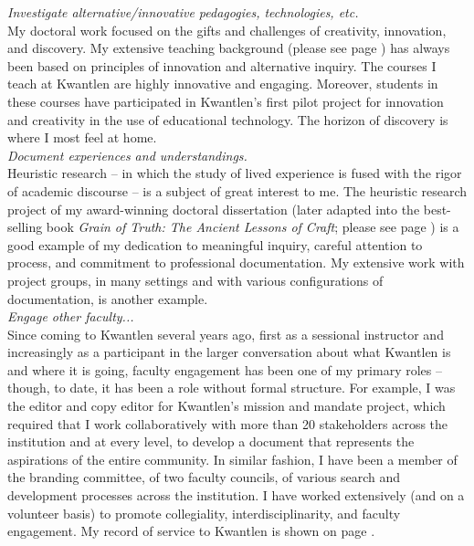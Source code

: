 \documentclass[10pt, a4paper]{article}
\begin{document}
\textit{Investigate alternative/innovative pedagogies, technologies, etc.}\\
My doctoral work focused on the gifts and challenges of creativity, innovation, and discovery. My extensive teaching background 
(please see page \pageref{teaching}) has always been based on principles of innovation and alternative inquiry. The courses I teach at Kwantlen are highly innovative and engaging. Moreover, students in these courses have participated in Kwantlen's first pilot project for innovation and creativity in the use of educational technology. The horizon of discovery is where I most feel at home.\\

\textit{Document experiences and understandings.}\\
Heuristic research -- in which the study of lived experience is fused with the rigor of academic discourse -- is a subject of great interest to me. The heuristic research project of my award-winning doctoral dissertation (later adapted into the best-selling book \textit{Grain of Truth: The Ancient Lessons of Craft}; please see page \pageref{grain}) is a good example of my dedication to meaningful inquiry, careful attention to process, and commitment to professional documentation. My extensive work with project groups, in many settings and with various configurations of documentation, is another example.\\

\textit{Engage other faculty...}\\
Since coming to Kwantlen several years ago, first as a sessional instructor and increasingly as a participant in the larger conversation about what Kwantlen is and where it is going, faculty engagement has been one of my primary roles -- though, to date, it has been a role without formal structure. For example, I was the editor and copy editor for Kwantlen's mission and mandate project, which required that I work collaboratively with more than 20 stakeholders across the institution and at every level, to develop a document that represents the aspirations of the entire community. In similar fashion, I have been a member of the branding committee, of two faculty councils, of various search and development processes across the institution. I have worked extensively (and on a volunteer basis) to promote collegiality, interdisciplinarity, and faculty engagement. My record of service to Kwantlen is shown on page \pageref{service}.\\
\end{document}
